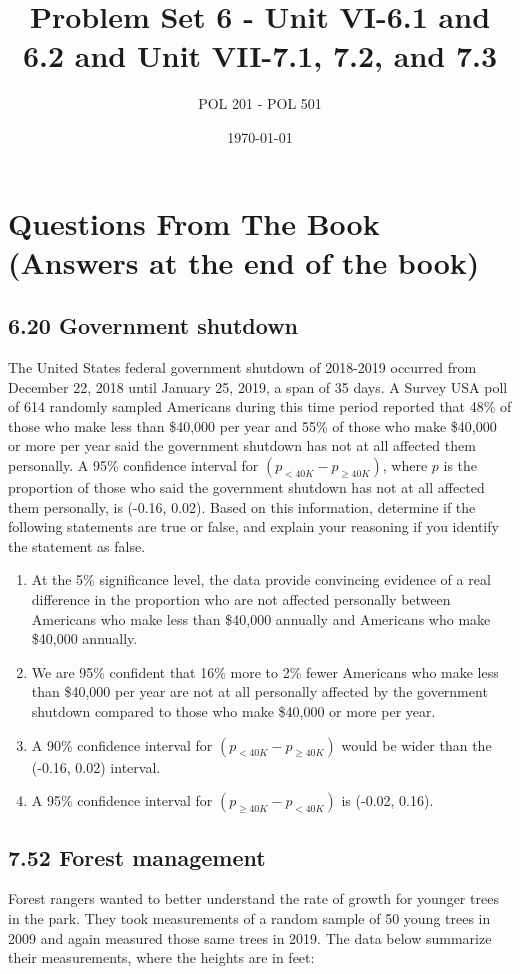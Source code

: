 \documentclass{article}
\title{Problem Set 6 - Unit VI-6.1 and 6.2 and Unit VII-7.1, 7.2, and 7.3 }
\author{POL 201 - POL 501}
\date{\today}
\begin{document}
\maketitle

\section*{Questions From The Book (Answers at the end of the book)}

\subsection*{6.20 Government shutdown}
The United States federal government shutdown of 2018-2019 occurred from December 22, 2018 until January 25, 2019, a span of 35 days. A Survey USA poll of 614 randomly sampled Americans during this time period reported that 48\% of those who make less than \$40,000 per year and 55\% of those who make \$40,000 or more per year said the government shutdown has not at all affected them personally. A 95\% confidence interval for \((p_{<40K} - p_{\ge40K})\), where \(p\) is the proportion of those who said the government shutdown has not at all affected them personally, is (-0.16, 0.02). Based on this information, determine if the following statements are true or false, and explain your reasoning if you identify the statement as false.

\begin{enumerate}
    \item At the 5\% significance level, the data provide convincing evidence of a real difference in the proportion who are not affected personally between Americans who make less than \$40,000 annually and Americans who make \$40,000 annually.
    \item We are 95\% confident that 16\% more to 2\% fewer Americans who make less than \$40,000 per year are not at all personally affected by the government shutdown compared to those who make \$40,000 or more per year.
    \item A 90\% confidence interval for \((p_{<40K} - p_{\ge40K})\) would be wider than the (-0.16, 0.02) interval.
    \item A 95\% confidence interval for \((p_{\ge40K} - p_{<40K})\) is (-0.02, 0.16).
\end{enumerate}

\subsection*{7.52 Forest management}
Forest rangers wanted to better understand the rate of growth for younger trees in the park. They took measurements of a random sample of 50 young trees in 2009 and again measured those same trees in 2019. The data below summarize their measurements, where the heights are in feet:
\end{document}

